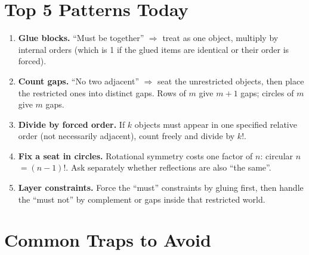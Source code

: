 \documentclass[11pt,a4paper]{article}
\begin{document}
\section*{Top 5 Patterns Today}

\begin{enumerate}[leftmargin=2em, itemsep=4pt]
  \item \textbf{Glue blocks.} ``Must be together'' $\Rightarrow$ treat as one object, multiply by internal orders (which is 1 if the glued items are identical or their order is forced). 
  \item \textbf{Count gaps.} ``No two adjacent'' $\Rightarrow$ seat the unrestricted objects, then place the restricted ones into distinct gaps. Rows of $m$ give $m+1$ gaps; circles of $m$ give $m$ gaps. 
  \item \textbf{Divide by forced order.} If $k$ objects must appear in one specified relative order (not necessarily adjacent), count freely and divide by $k!$. 
  \item \textbf{Fix a seat in circles.} Rotational symmetry costs one factor of $n$: circular $n$ $=(n-1)!$. Ask separately whether reflections are also ``the same''. 
  \item \textbf{Layer constraints.} Force the ``must'' constraints by gluing first, then handle the ``must not'' by complement or gaps inside that restricted world. 
\end{enumerate}

\section*{Common Traps to Avoid}
\end{document}
